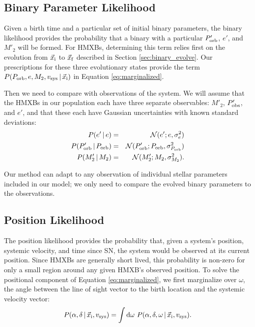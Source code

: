\documentclass[usenatbib]{mnras}
\newcommand{\given}{\,|\,}
\newcommand{\dd}{\mathrm{d}}
\begin{document}
\subsection{Binary Parameter Likelihood} \label{sec:likelihood_ind_binary}

Given a birth time and a particular set of initial binary parameters, the binary likelihood provides the probability that a binary with a particular $P'_{\rm orb}$, $e'$, and $M'_2$ will be formed. For HMXBs, determining this term relies first on the evolution from $\vec{x}_{\rm i}$ to $\vec{x}_{\rm f}$ described in Section \ref{sec:binary_evolve}. Our prescriptions for these three evolutionary states provide the term $P(P_{\rm orb}, e, M_2, v_{\rm sys} \given \vec{x}_{\rm i})$ in Equation \ref{eq:marginalized}. 

Then we need to compare with observations of the system. We will assume that the HMXBs in our population each have three separate observables: $M'_2$, $P'_{\rm obs}$, and $e'$, and that these each have Gaussian uncertainties with known standard deviations:
\begin{eqnarray}
P(e' \given e) &=& \mathcal{N}(e' ; e, \sigma^2_e) \\
P(P_{\rm orb}' \given P_{\rm orb}) &=& \mathcal{N}(P_{\rm orb}' ; P_{\rm orb}, \sigma^2_{P_{\rm orb}}) \\
P(M'_2 \given M_2) &=& \mathcal{N}(M'_2; M_2, \sigma^2_{M_2}).
\end{eqnarray}

Our method can adapt to any observation of individual stellar parameters included in our model; we only need to compare the evolved binary parameters to the observations.


\subsection{Position Likelihood} \label{sec:ra_dec}
The position likelihood provides the probability that, given a system's position, systemic velocity, and time since SN, the system would be observed at its current position. Since HMXBs are generally short lived, this probability is non-zero for only a small region around any given HMXB's observed position. To solve the positional component of Equation \ref{eq:marginalized}, we first marginalize over $\omega$, the angle between the line of sight vector to the birth location and the systemic velocity vector:
\begin{equation}
P(\alpha, \delta \given \vec{x}_{\rm i}, v_{\rm sys} ) = \int \dd \omega\ P(\alpha, \delta, \omega \given \vec{x}_{\rm i}, v_{\rm sys} ). \label{eq:P_pos_1}
\end{equation}
\end{document}
